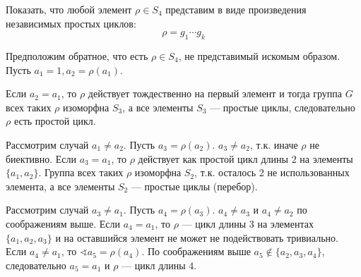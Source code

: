 \begin{exercise}
    Показать, что любой элемент \(\rho \in S_4\) представим в виде произведения независимых простых циклов:
    \[\rho = g_1 \cdots g_k\]
\end{exercise}
\begin{solution}
    Предположим обратное, что есть \(\rho \in S_4\), не представимый искомым образом. Пусть \(a_1 = 1, a_2 = \rho(a_1)\).

    Если \(a_2 = a_1\), то \(\rho\) действует тождественно на первый элемент и тогда группа \(G\) всех таких \(\rho\) изоморфна \(S_3\), а все элементы \(S_3\) --- простые циклы, следовательно \(\rho\) есть простой цикл.

    Рассмотрим случай \(a_1 \neq a_2\). Пусть \(a_3 = \rho(a_2)\). \(a_3 \neq a_2\), т.к. иначе \(\rho\) не биективно. Если \(a_3 = a_1\), то \(\rho\) действует как простой цикл длины \(2\) на элементы \(\{a_1, a_2\}\). Группа всех таких \(\rho\) изоморфна \(S_2\), т.к. осталось 2 не использованных элемента, а все элементы \(S_2\) --- простые циклы (перебор).

    Рассмотрим случай \(a_3 \neq a_1\). Пусть \(a_4 = \rho(a_3)\). \(a_4 \neq a_3\) и \(a_4 \neq a_2\) по соображениям выше. Если \(a_4 = a_1\), то \(\rho\) --- цикл длины \(3\) на элементах \(\{a_1, a_2, a_3\}\) и на оставшийся элемент не может не подействовать тривиально. Если \(a_4 \neq a_1\), то \(\sphericalangle a_5 = \rho(a_4)\). По соображениям выше \(a_5 \notin \{a_2, a_3, a_4\}\), следовательно \(a_5 = a_1\) и \(\rho\) --- цикл длины \(4\).


\end{solution}
